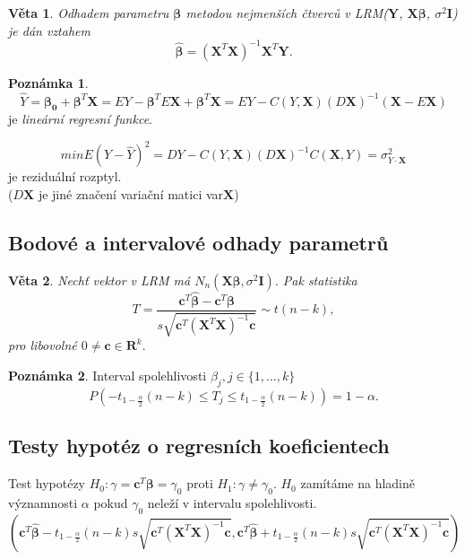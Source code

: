 \documentclass[a4]{report}
\newtheorem{theorem}{Věta}
\theoremstyle{definition}
\newtheorem{notes}{Poznámka}[section]
\begin{document}
{\begin{theorem}
Odhadem parametru $\pmb{\beta}$ metodou nejmenších čtverců v LRM($\mathbf{Y}$, $\mathbf{X} \pmb{\beta}$, $\sigma^2 \mathbf{I}$) je dán vztahem $$\pmb{\hat{\beta}} = \left( \mathbf{X}^T \mathbf{X} \right) ^{-1} \mathbf{X}^T \mathbf{Y}.$$
\end{theorem}

\begin{notes}$$
\hat{Y} = \mathbf{\beta_0} + \pmb{\beta}^T \mathbf{X} = E Y - \pmb{\beta}^T E \mathbf{X} + \pmb{\beta}^T \mathbf{X} = E Y - C\left( Y, \mathbf{X} \right) \left( D \mathbf{X} \right) ^ {-1} \left( \mathbf{X} - E \mathbf{X} \right)$$
je \textit{lineární regresní funkce}. 

$$min E (Y - \hat{Y})^{2} = DY - C\left( Y, \mathbf{X} \right) \left( D \mathbf{X} \right) ^ {-1} C \left( \mathbf{X}, Y \right) = \sigma^{2}_{Y \cdot \mathbf{X} }$$ je reziduální rozptyl.
\\ ($D \mathbf{X}$ je jiné značení variační matici var$\mathbf{X}$)
\end{notes}

\subsection{Bodové a intervalové odhady parametrů}
\begin{theorem}
Nechť vektor  v LRM má $N_n\left(\pmb{X} \pmb{\beta}, \sigma^2 \pmb{I} \right).$ Pak statistika $$T = \frac{\pmb{c}^T \hat{\pmb{\beta}} - \pmb{c}^T \pmb{\beta}}{s \sqrt{\pmb{c}^T \left(\pmb{X}^T \pmb{X} \right)^{-1} \pmb{c}} } \sim t \left(n-k \right),$$ pro libovolné $0 \neq \pmb{c} \in \pmb{R}^k.$ 
\end{theorem}

\begin{notes}
Interval spolehlivosti $\beta_j, j \in \{1, \ldots , k \}$ $$P\left(-t_{1-\frac{\alpha}{2}} \left(n-k \right) \leq T_j \leq t_{1-\frac{\alpha}{2}} \left(n-k \right) \right) = 1- \alpha.$$ 
\end{notes}
\subsection{Testy hypotéz o regresních koeficientech}
Test hypotézy $H_0 : \gamma = \pmb{c}^T \pmb{\beta} = \gamma_0$ proti $H_1: \gamma \neq \gamma_0$. $H_0$ zamítáme na hladině významnosti $\alpha$ pokud $\gamma_0$ neleží v intervalu spolehlivosti. 
$$\left(\pmb{c}^T \hat{\pmb{\beta}} - t_{1-\frac{\alpha}{2}} \left(n-k \right)  s \sqrt{\pmb{c}^T \left(\pmb{X}^T \pmb{X} \right)^{-1} \pmb{c}},\pmb{c}^T \hat{\pmb{\beta}} + t_{1-\frac{\alpha}{2}} \left(n-k \right) s \sqrt{\pmb{c}^T \left(\pmb{X}^T \pmb{X} \right)^{-1} \pmb{c}} \right) $$

}
\end{document}
